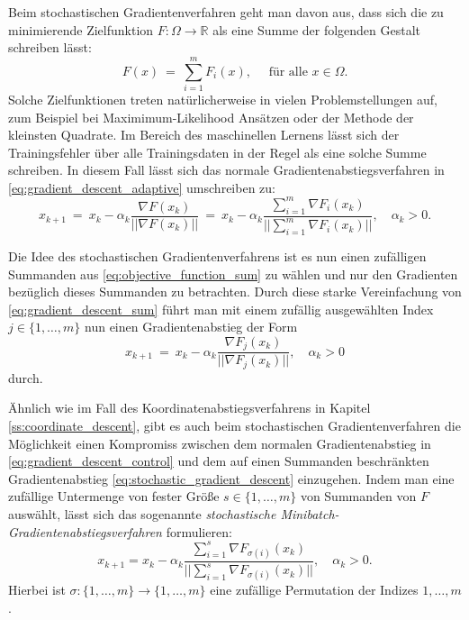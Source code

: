 Beim stochastischen Gradientenverfahren geht man davon aus, dass sich die zu minimierende Zielfunktion $F \colon \Omega \rightarrow \mathbb{R}$ als eine Summe der folgenden Gestalt schreiben lässt:
\begin{equation}
\label{eq:objective_function_sum}
F(x) \ = \ \sum_{i=1}^m F_i(x), \quad \text{ für alle } x \in \Omega.
\end{equation} 
Solche Zielfunktionen treten natürlicherweise in vielen Problemstellungen auf, zum Beispiel bei Maximimum-Likelihood Ansätzen oder der Methode der kleinsten Quadrate.
Im Bereich des maschinellen Lernens lässt sich der Trainingsfehler über alle Trainingsdaten in der Regel als eine solche Summe  schreiben.
In diesem Fall lässt sich das normale Gradientenabstiegsverfahren in \eqref{eq:gradient_descent_adaptive} umschreiben zu:
\begin{equation}
\label{eq:gradient_descent_sum}
x_{k+1} \ = \ x_k - \alpha_k \frac{\nabla F(x_k)}{||\nabla F(x_k)||} \ = \ x_k - \alpha_k \frac{\sum_{i=1}^m\nabla F_i(x_k)}{||\sum_{i=1}^m\nabla F_i(x_k)||}, \quad \alpha_k > 0 .
\end{equation}

Die Idee des stochastischen Gradientenverfahrens ist es nun einen zufälligen Summanden aus \eqref{eq:objective_function_sum} zu wählen und nur den Gradienten bezüglich dieses Summanden zu betrachten.
Durch diese starke Vereinfachung von \eqref{eq:gradient_descent_sum} führt man mit einem zufällig ausgewählten Index $j \in \lbrace 1,\ldots,m\rbrace$ nun einen Gradientenabstieg der Form
\begin{equation}
\label{eq:stochastic_gradient_descent}
x_{k+1} \ = \ x_k - \alpha_k \frac{\nabla F_j(x_k)}{||\nabla F_j(x_k)||}, \quad \alpha_k > 0
\end{equation}
durch.
\begin{remark}{}{}
Ähnlich wie im Fall des Koordinatenabstiegsverfahrens in Kapitel \ref{ss:coordinate_descent}, gibt es auch beim stochastischen Gradientenverfahren die Möglichkeit einen Kompromiss zwischen dem normalen Gradientenabstieg in \eqref{eq:gradient_descent_control} und dem auf einen Summanden beschränkten Gradientenabstieg \eqref{eq:stochastic_gradient_descent} einzugehen. 
Indem man eine zufällige Untermenge von fester Größe $s \in \lbrace 1,\ldots,m\rbrace$ von Summanden von $F$ auswählt, lässt sich das sogenannte \textit{stochastische Minibatch-Gradientenabstiegsverfahren} formulieren:
\begin{equation*}
x_{k+1} = x_k - \alpha_k \frac{\sum_{i=1}^s\nabla F_{\sigma(i)}(x_k)}{||\sum_{i=1}^s\nabla F_{\sigma(i)}(x_k)||}, \quad \alpha_k > 0 .
\end{equation*}
Hierbei ist $\sigma \colon \lbrace 1,\ldots,m\rbrace \rightarrow \lbrace 1,\ldots,m\rbrace$ eine zufällige Permutation der Indizes $1,\ldots,m$.
\end{remark}

